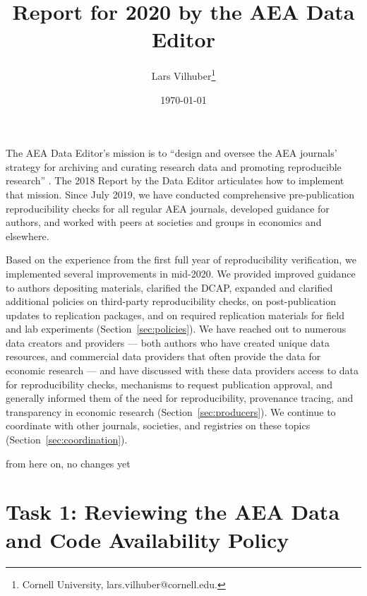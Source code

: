 \documentclass[PP]{AEA}
\begin{document}
\title{Report for 2020 by the AEA Data Editor }
\author{Lars Vilhuber\thanks{%
Cornell University, lars.vilhuber@cornell.edu. }
}
\date{\today}
\pubVolume{--}
\pubIssue{--}
\JEL{}




\maketitle

The \ac{AEA} Data Editor's  mission is to ``design  and  oversee  the  AEA  journals’  strategy for archiving and curating research data and promoting  reproducible  research'' \citep{10.1257/pandp.108.745}. The 2018 Report by the Data Editor \citep{10.1257/pandp.109.718} articulates how to implement that mission. Since July 2019, we have conducted comprehensive pre-publication reproducibility checks for all regular AEA journals, developed guidance for authors, and worked with peers at societies and groups in economics and elsewhere. 

Based on the experience from the first full year of reproducibility verification, we implemented several improvements in mid-2020. We provided improved guidance to authors depositing materials, clarified the \ac{DCAP}, expanded and clarified additional policies on third-party reproducibility checks, on post-publication updates to replication packages, and on required replication materials for field and lab experiments  (Section~\ref{sec:policies}). We have reached out to numerous data creators and providers --- both authors who have created unique data resources, and commercial data providers that often provide the data for economic research --- and have discussed with these data providers access to data for reproducibility checks, mechanisms to request publication approval, and generally informed them of the need for reproducibility, provenance tracing, and transparency in economic research (Section~\ref{sec:producers}). 
We continue to coordinate with other journals, societies, and registries on these topics (Section~\ref{sec:coordination}).

\begin{center}
	from here on, no changes yet
\end{center}

\section{Task 1: Reviewing the AEA Data and Code Availability Policy}
\label{sec:dcap}
\end{document}
